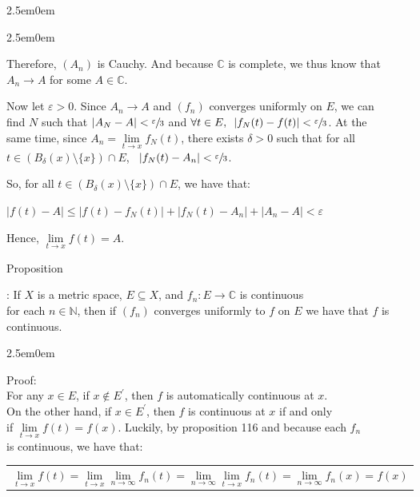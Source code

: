 \documentclass{book}
\newcommand{\hThree}{%
   \color{PineGreen!85!Orange}
   \fontsize{13}{15}\selectfont%
}
\newenvironment{myIndent}{%
   \begin{adjustwidth}{2.5em}{0em}%
}{%
   \end{adjustwidth}%
}
\newcommand{\myHS}{ \hspace{0.5em}}
\newcounter{PropNumber}
\newcommand{\propCount}[1][1]{%
   \addtocounter{PropNumber}{#1}%
   \thePropNumber%
}
\newcommand{\retTwo}{\hfill\bigbreak}
\begin{document}
{\begin{myIndent}
{\begin{myIndent}
      Therefore, $(A_n)$ is Cauchy. And because $\mathbb{C}$ is complete, we thus know that\\ $A_n \rightarrow A$ for some $A \in \mathbb{C}$.\retTwo

      Now let $\varepsilon > 0$. Since $A_n \rightarrow A$ and $(f_n)$ converges uniformly on $E$, we can\\ [2pt] find $N$ such that $|A_N - A| < \sfrac{\varepsilon}{3}$ and $\forall t \in E, \myHS |f_N(t) - f(t)| < \sfrac{\varepsilon}{3}$. At the\\ [2pt] same time, since $A_n = \lim\limits_{t\rightarrow x} f_N(t)$, there exists $\delta > 0$ such that for all\\ [0pt] $t \in (B_\delta(x) \setminus \{x\}) \cap E$, $\myHS |f_N(t) - A_n| < \sfrac{\varepsilon}{3}$.\retTwo
      
      So, for all $t \in (B_\delta(x) \setminus \{x\}) \cap E$, we have that:

      {\center $|f(t) - A| \leq |f(t) - f_N(t)| + |f_N(t) - A_n| + |A_n - A| < \varepsilon$ \retTwo\par}

      Hence, $\lim\limits_{t\rightarrow x}f(t) = A$.
   \end{myIndent}}

   \newpage

   Proposition \propCount: If $X$ is a metric space, $E \subseteq X$, and $f_n: E \longrightarrow \mathbb{C}$ is continuous\\ for each $n \in \mathbb{N}$, then if $(f_n)$ converges uniformly to $f$ on $E$ we have that $f$ is\\ continuous.\\ [-12pt]

   {\begin{myIndent}\hThree
      Proof:\\ [3pt]
      For any $x \in E$, if $x \notin E^\prime$, then $f$ is automatically continuous at $x$.\\ [3pt] On the other hand, if $x \in E^\prime$, then $f$ is continuous at $x$ if and only\\ [3pt] if $\lim\limits_{t\rightarrow x}f(t) = f(x)$. Luckily, by proposition 116 and because each $f_n$\\ is continuous, we have that:\\ [-12pt]

      \begin{center}
         \begin{tabular}{l}
            $\lim\limits_{t\rightarrow x}f(t) = \lim\limits_{t\rightarrow x}\lim\limits_{n\rightarrow \infty} f_n(t) = \lim\limits_{n\rightarrow \infty}\lim\limits_{t\rightarrow x} f_n(t) = \lim\limits_{n\rightarrow \infty}f_n(x) = f(x)$
         \end{tabular}
      \end{center}\retTwo
   \end{myIndent}}


\end{myIndent}}
\end{document}
